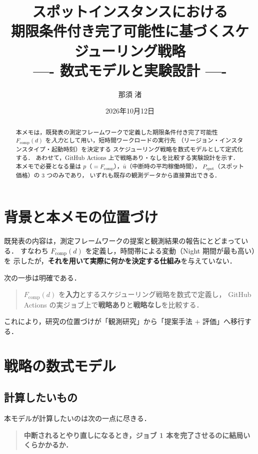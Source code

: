 \documentclass[11pt,a4paper]{ltjsarticle}
\title{スポットインスタンスにおける\\
       期限条件付き完了可能性に基づくスケジューリング戦略\\
       \large ---- 数式モデルと実験設計 ----}
\author{那須 渚}
\date{2026年10月12日}
\newcommand{\Fcomp}{F_{\mathrm{comp}}}
\newcommand{\Pspot}{P_{\mathrm{spot}}}
\begin{document}
\maketitle

\begin{abstract}
本メモは，既発表の測定フレームワークで定義した期限条件付き完了可能性
$\Fcomp(d)$ を\emph{入力}として用い，短時間ワークロードの実行先
（リージョン・インスタンスタイプ・起動時刻）を決定する
スケジューリング戦略を数式モデルとして定式化する．
あわせて，GitHub Actions 上で戦略あり・なしを比較する実験設計を示す．
本メモで必要となる量は $p$（$=\Fcomp$），$\bar u$（中断時の平均稼働時間），
$\Pspot$（スポット価格）の 3 つのみであり，
いずれも既存の観測データから直接算出できる．
\end{abstract}

\tableofcontents

\section{背景と本メモの位置づけ}

既発表の内容は，測定フレームワークの提案と観測結果の報告にとどまっている．
すなわち $\Fcomp(d)$ を定義し，時間帯による変動（Night 期間が最も高い）を
示したが，\textbf{それを用いて実際に何かを決定する仕組み}を与えていない．

次の一歩は明確である．

\begin{quote}
$\Fcomp(d)$ を\textbf{入力}とするスケジューリング戦略を数式で定義し，
GitHub Actions の実ジョブ上で\textbf{戦略あり}と\textbf{戦略なし}を比較する．
\end{quote}

これにより，研究の位置づけが「観測研究」から「提案手法 $+$ 評価」へ移行する．

\section{戦略の数式モデル}

\subsection{計算したいもの}

本モデルが計算したいのは次の一点に尽きる．

\begin{quote}
\textbf{中断されるとやり直しになるとき，ジョブ 1 本を完了させるのに結局いくらかかるか．}
\end{quote}
\end{document}
